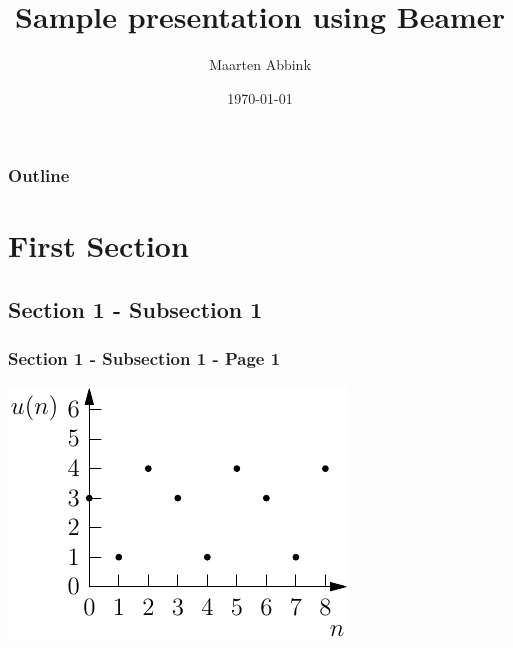 \documentclass{beamer}
\title[Beamer Sample]{Sample presentation using Beamer}
\institute[TU Delft]{Delft University of Technology}
\author{Maarten Abbink}
\date{\today}
\newcommand*\titleTOC{Outline}
\begin{document}
{
%
\frame{\titlepage}
}

{
\begin{frame}\frametitle{\titleTOC}
	\tableofcontents
\end{frame}
}

\section{First Section}
\subsection{Section 1 - Subsection 1}

\begin{frame}\frametitle{Section 1 - Subsection 1 - Page 1}
	\begin{example}
		\begin{minipage}{0.6\textwidth}
			\includegraphics{images/ex1_periodic_number.pdf}
		\end{minipage}
	\end{example}
\end{frame}
\end{document}

